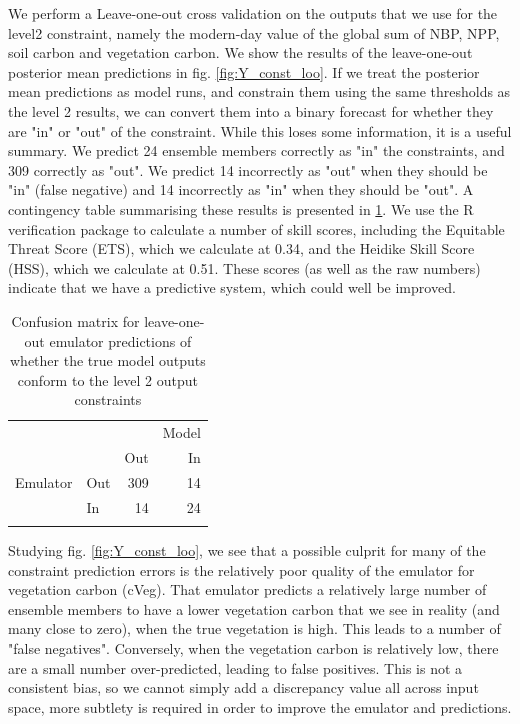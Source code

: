 \documentclass[gmd, manuscript]{copernicus}
\begin{document}
We perform a Leave-one-out cross validation on the outputs that we use for the level2 constraint, namely the modern-day value of the global sum of NBP, NPP, soil carbon and vegetation carbon. We show the results of the leave-one-out posterior mean predictions in fig. \ref{fig:Y_const_loo}. If we treat the posterior mean predictions as model runs, and constrain them using the same thresholds as the level 2 results, we can convert them into a binary forecast for whether they are "in" or "out" of the constraint. While this loses some information, it is a useful summary. We predict 24 ensemble members correctly as "in" the constraints, and 309 correctly as "out". We predict 14 incorrectly as "out" when they should be "in" (false negative) and 14 incorrectly as "in" when they should be "out". A contingency table summarising these results is presented in \ref{table:level_2_contingency}. We use the R verification package \cite{R2015verification} to calculate a number of skill scores, including the Equitable Threat Score (ETS), which we calculate at 0.34, and the Heidike Skill Score (HSS), which we calculate at 0.51. These scores (as well as the raw numbers) indicate that we have a predictive system, which could well be improved.

\begin{table}[ht]
\caption{Confusion matrix for leave-one-out emulator predictions of whether the true model outputs conform to the level 2 output constraints}
\label{table:level_2_contingency}
\begin{tabular}{l l r r}
\tophline
 &  &  & Model \\ 
& & Out &  In\\
Emulator & Out & 309 &  14 \\
 & In & 14 & 24 \\

\bottomhline
\end{tabular}
\belowtable{} %

\end{table}

Studying fig. \ref{fig:Y_const_loo}, we see that a possible culprit for many of the constraint prediction errors is the relatively poor quality of the emulator for vegetation carbon (cVeg). That emulator predicts a relatively large number of ensemble members to have a lower vegetation carbon that we see in reality (and many close to zero), when the true vegetation is high. This leads to a number of "false negatives". Conversely, when the vegetation carbon is relatively low, there are a small number over-predicted, leading to false positives. This is not a consistent bias, so we cannot simply add a discrepancy value all across input space, more subtlety is required in order to improve the emulator and predictions.
\end{document}
